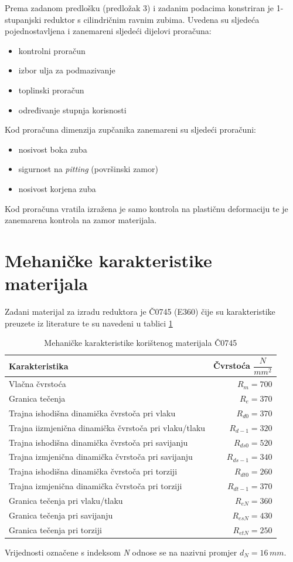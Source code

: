 \documentclass[11pt,a4paper]{report}
\begin{document}
Prema zadanom predlošku (predložak 3) i zadanim podacima konstriran je 1-stupanjski reduktor s cilindričnim ravnim zubima.
Uvedena su sljedeća pojednostavljena i zanemareni sljedeći dijelovi proračuna:
\begin{itemize}
\item kontrolni proračun
\item izbor ulja za podmazivanje
\item toplinski proračun
\item određivanje stupnja korisnosti
\end{itemize}
Kod proračuna dimenzija zupčanika zanemareni su sljedeći proračuni:
\begin{itemize}
\item nosivost boka zuba
\item sigurnost na \textit{pitting} (površinski zamor)
\item nosivost korjena zuba
\end{itemize}
Kod proračuna vratila izražena je samo kontrola na plastičnu deformaciju te je zanemarena kontrola na zamor materijala.
\newpage
\section{Mehaničke karakteristike materijala}
Zadani materijal za izradu reduktora je Č0745 (E360) čije su karakteristike preuzete iz literature \cite{potrebniMaterijali} te su navedeni u tablici \ref{MehanickeKarakteristikeMaterijala}
\begin{table}[h]
\begin{tabular}{|l|r|}\hline 
Karakteristika & Čvrstoća $\dfrac{N}{mm^2}$ \\ \hline 
Vlačna čvrstoća & $R_m=700 $ \\ \hline 
Granica tečenja & $R_e=370 $ \\ \hline 
Trajna ishodišna dinamička čvrstoča pri vlaku & $R_{d0}=370 $ \\ \hline 
Trajna iizmjenična dinamička čvrstoča pri vlaku/tlaku & $R_{d-1}=320 $ \\ \hline 
Trajna ishodišna dinamička čvrstoča pri savijanju & $R_{ds0}=520 $ \\ \hline 
Trajna izmjenična dinamička čvrstoča pri savijanju & $R_{ds-1}=340 $ \\ \hline 
Trajna ishodišna dinamička čvrstoča pri torziji & $R_{dt0}=260 $ \\ \hline 
Trajna izmjenična dinamička čvrstoča pri torziji & $R_{dt-1}=370 $ \\ \hline 
Granica tečenja pri vlaku/tlaku & $R_{eN}=360 $ \\ \hline 
Granica tečenja pri savijanju & $R_{esN}=430 $ \\ \hline 
Granica tečenja pri torziji & $R_{etN}=250 $ \\ \hline 
\end{tabular} 
Vrijednosti označene s indeksom \emph{N} odnose se na nazivni promjer $d_N=16\,mm$.
\caption{Mehaničke karakteristike korištenog materijala Č0745} \label{MehanickeKarakteristikeMaterijala}
\end{table}
\end{document}

